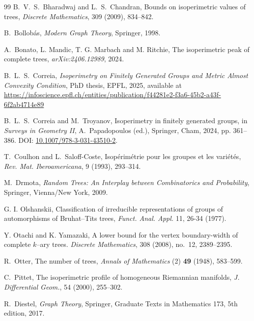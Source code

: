 \documentclass[a4paper, 11pt]{article}
\numberwithin{equation}{section}
\theoremstyle{definition}
\theoremstyle{remark}
\begin{document}
\begin{thebibliography}{99}
B.~V.~S.~Bharadwaj and L.~S.~Chandran,
\newblock Bounds on isoperimetric values of trees,
\newblock \emph{Discrete Mathematics}, 309 (2009), 834--842.

B.~Bollobás,
\newblock \emph{Modern Graph Theory},
\newblock Springer, 1998.

A.~Bonato,   L. Mandic, T. G. Marbach and M. Ritchie,
\newblock The isoperimetric peak of complete trees,
\newblock \emph{arXiv:2406.12989}, 2024.

B.~L.~S.~Correia,
\newblock \emph{Isoperimetry on Finitely Generated Groups and Metric Almost Convexity Condition},
\newblock PhD thesis, EPFL, 2025, available at \url{https://infoscience.epfl.ch/entities/publication/f44281e2-f3a6-45b2-a43f-6f2ab4714e89}

B.~L.~S.~Correia and M.~Troyanov,
\newblock Isoperimetry in finitely generated groups,
\newblock in \emph{Surveys in Geometry II}, A.~Papadopoulos (ed.),
Springer, Cham, 2024, pp. 361--386.
\newblock DOI: \href{https://doi.org/10.1007/978-3-031-43510-2}{10.1007/978-3-031-43510-2}.

T.~Coulhon and L.~Saloff-Coste,
\newblock Isopérimétrie pour les groupes et les variétés,
\newblock \emph{Rev. Mat. Iberoamericana}, 9 (1993), 293--314.

M.~Drmota,
\newblock \emph{Random Trees: An Interplay between Combinatorics and Probability},
\newblock Springer, Vienna/New York, 2009.

G. I. Olshanskii,
\newblock Classification of irreducible representations of groups of automorphisms of Bruhat–Tits trees,
\emph{Funct. Anal. Appl.} 11, 26-34 (1977). 
 
Y. Otachi and K. Yamazaki, 
\newblock A lower bound for the vertex boundary-width of complete $k$--ary trees.  
\emph{Discrete Mathematics}, 308 (2008), no.~12, 2389--2395.

R.~Otter,
\newblock The number of trees,
\newblock \emph{Annals of Mathematics} (2) \textbf{49} (1948), 583--599.


C.~Pittet,
\newblock The isoperimetric profile of homogeneous Riemannian manifolds,
\newblock \emph{J. Differential Geom.}, 54 (2000), 255--302.


R.~Diestel,
\newblock \emph{Graph Theory},
\newblock Springer, Graduate Texts in Mathematics 173, 5th edition, 2017.


\end{thebibliography}
\end{document}
